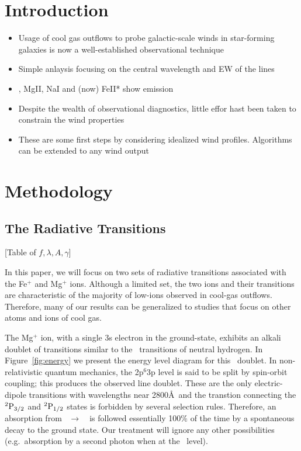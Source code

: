\documentclass[12pt,preprint]{aastex}
\begin{document}

\section{Introduction}

\begin{itemize}
\item Usage of cool gas outflows to probe galactic-scale winds in
  star-forming galaxies is now a well-established observational
  technique
\item Simple anlaysis focusing on the central wavelength and EW of the
  lines
\item \lya, MgII, NaI and (now) FeII* show emission
\item Despite the wealth of observational diagnostics, little effor
  hast been taken to constrain the wind properties
\item These are some first steps by considering idealized wind
  profiles.  Algorithms can be extended to any wind output
\end{itemize}

\section{Methodology}
\label{sec:method}

\subsection{The Radiative Transitions}

[Table of $f,\lambda,A,\gamma$]

In this paper, we will focus on two sets of radiative transitions
associated with the Fe$^+$ and Mg$^+$ ions.
Although a limited
set, the two ions and their transitions are characteristic
of the majority of low-ions 
observed in cool-gas outflows. Therefore, many
of our results can be generalized to studies that focus on other atoms
and ions of cool gas.

The Mg$^+$ ion, with a single 3s electron in the ground-state,
exhibits an alkali doublet of transitions similar to the
\lya\ transitions of neutral hydrogen.  In Figure~\ref{fig:energy}
we present the energy level diagram for this 
\mgiid\ doublet.  In non-relativistic quantum
mechanics, the 2p$^6$3p level is said to be split by spin-orbit
coupling; this produces the observed line doublet.  These are the only
 electric-dipole transitions 
with wavelengths near 2800\AA\ and the transtion connecting
the $\rm {}^2P_{3/2}$ and $\rm {}^2P_{1/2}$ states is forbidden by several
selection rules.  Therefore, an absorption from
\maconfig~$\to$~\mbconfig\
is followed essentially 100$\%$ of the time by a spontaneous decay to the
ground state. Our treatment will ignore any other possibilities
(e.g.\ absorption by a second photon when at the \mbconfig\ level).
\end{document}
